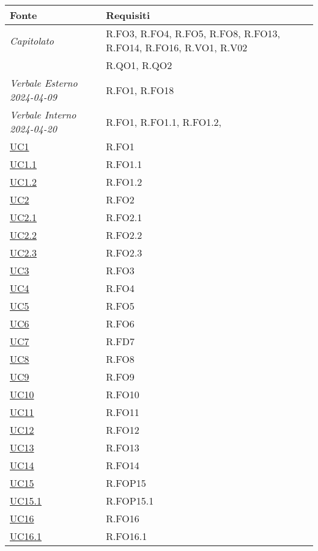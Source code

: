 \begin{longtable}{|P{4,5cm}|>{\arraybackslash}P{9cm}|}
  \hline
  \textbf{Fonte} & \textbf{Requisiti} \\
  \hline
  \emph{Capitolato} & R.FO3, R.FO4, R.FO5, R.FO8, R.FO13, R.FO14, R.FO16, R.VO1, R.V02 \\
  \hline
  \NdP{} & R.QO1, R.QO2 \\
  \hline
  \emph{Verbale Esterno 2024-04-09} & R.FO1, R.FO18 \\
  \hline
  \emph{Verbale Interno 2024-04-20} & R.FO1, R.FO1.1, R.FO1.2,  \\
  \hline
  \hyperref[UC1]{UC1} & R.FO1 \\
  \hline
  \hyperref[UC1point1]{UC1.1} & R.FO1.1 \\
  \hline
  \hyperref[UC1]{UC1.2} & R.FO1.2 \\
  \hline
  \hyperref[UC2]{UC2} & R.FO2 \\
  \hline
  \hyperref[UC2point1]{UC2.1} & R.FO2.1 \\
  \hline
  \hyperref[UC2point2]{UC2.2} & R.FO2.2 \\
  \hline
  \hyperref[UC2point3]{UC2.3} & R.FO2.3 \\
  \hline
  \hyperref[UC3]{UC3} & R.FO3 \\
  \hline
  \hyperref[UC4]{UC4} & R.FO4 \\
  \hline
  \hyperref[UC5]{UC5} & R.FO5 \\
  \hline
  \hyperref[UC6]{UC6} & R.FO6 \\
  \hline
  \hyperref[UC7]{UC7} & R.FD7 \\
  \hline
  \hyperref[UC8]{UC8} & R.FO8 \\
  \hline
  \hyperref[UC9]{UC9} & R.FO9 \\
  \hline
  \hyperref[UC10]{UC10} & R.FO10 \\
  \hline
  \hyperref[UC11]{UC11} & R.FO11 \\
  \hline
  \hyperref[UC12]{UC12} & R.FO12 \\
  \hline
  \hyperref[UC13]{UC13} & R.FO13 \\
  \hline
  \hyperref[UC14]{UC14} & R.FO14 \\
  \hline
  \hyperref[UC15]{UC15} & R.FOP15 \\
  \hline
  \hyperref[UC15point1]{UC15.1} & R.FOP15.1 \\
  \hline
  \hyperref[UC16]{UC16} & R.FO16 \\
  \hline
  \hyperref[UC16point1]{UC16.1} & R.FO16.1 \\

\end{longtable}
